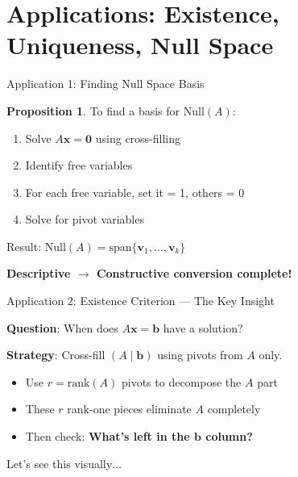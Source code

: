 \documentclass[10pt]{beamer}
\theoremstyle{definition}
\newtheorem{prop}{Proposition}[section]
\newcommand{\x}[1]{\alert{\textbf{#1}}}
\begin{document}
\section{Applications: Existence, Uniqueness, Null Space}

\begin{frame}{Application 1: Finding Null Space Basis}

\begin{prop}
To find a basis for $\text{Null}(A)$:

\begin{enumerate}
\item Solve $A\mathbf{x} = \mathbf{0}$ using cross-filling
\item Identify free variables
\item For each free variable, set it = 1, others = 0
\item Solve for pivot variables
\end{enumerate}

Result: $\text{Null}(A) = \text{span}\{\mathbf{v}_1, \ldots, \mathbf{v}_k\}$

\x{Descriptive $\to$ Constructive conversion complete!}
\end{prop}

\end{frame}

\begin{frame}{Application 2: Existence Criterion — The Key Insight}

\x{Question}: When does $A\mathbf{x} = \mathbf{b}$ have a solution?

\vspace{1em}

\x{Strategy}: Cross-fill $(A \mid \mathbf{b})$ using pivots from $A$ only.

\vspace{0.5em}

\begin{itemize}
\item Use $r = \text{rank}(A)$ pivots to decompose the $A$ part
\item These $r$ rank-one pieces eliminate $A$ completely
\item Then check: \x{What's left in the $\mathbf{b}$ column?}
\end{itemize}

\vspace{1em}

Let's see this visually$\ldots$

\end{frame}
\end{document}
